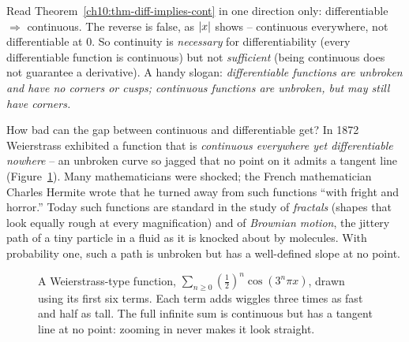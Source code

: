 \begin{trapbox}
Read Theorem~\ref{ch10:thm-diff-implies-cont} in one direction only:
differentiable $\Rightarrow$ continuous. The reverse is false,
as $\lvert x\rvert$ shows -- continuous everywhere, not differentiable at $0$. So
continuity is \emph{necessary} for differentiability (every differentiable
function is continuous) but not \emph{sufficient} (being continuous does not
guarantee a derivative). A handy slogan: \emph{differentiable functions are
unbroken and have no corners or cusps; continuous functions are unbroken, but
may still have corners.}
\end{trapbox}

\begin{aestheticbox}
How bad can the gap between continuous and differentiable get? In 1872 Weierstrass
exhibited a function that is \emph{continuous everywhere yet differentiable nowhere}
-- an unbroken curve so jagged that no point on it admits a tangent line
(Figure~\ref{ch10:fig-weierstrass}). Many mathematicians were shocked; the
French mathematician Charles Hermite wrote that he turned away from such
functions ``with fright and horror.'' Today such functions are standard in the
study of \emph{fractals} (shapes that look equally rough at every magnification)
and of \emph{Brownian motion}, the jittery path of a tiny particle in a fluid as
it is knocked about by molecules. With probability one, such a path is unbroken
but has a well-defined slope at no point.
\end{aestheticbox}

\begin{figure}[htbp]
\centering
{}
\caption{A Weierstrass-type function, $\sum_{n\ge 0} (\tfrac12)^n \cos(3^n \pi x)$,
drawn using its first six terms. Each term adds wiggles three times as fast and
half as tall. The full infinite sum is continuous but has a tangent line at no
point: zooming in never makes it look straight.}
\label{ch10:fig-weierstrass}
\end{figure}

